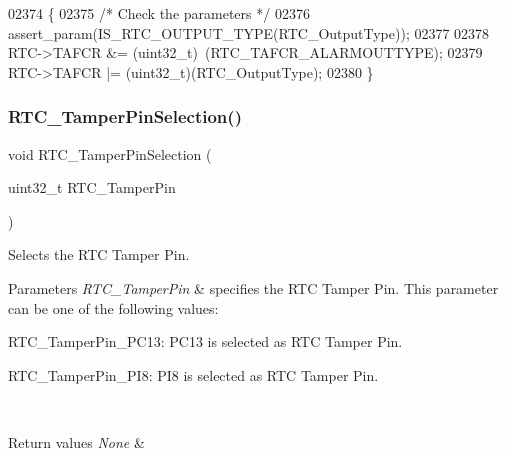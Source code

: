\begin{DoxyCode}
02374 \{
02375   \textcolor{comment}{/* Check the parameters */}
02376   assert_param(IS_RTC_OUTPUT_TYPE(RTC\_OutputType));
02377   
02378   RTC->TAFCR &= (uint32\_t)~(RTC_TAFCR_ALARMOUTTYPE);
02379   RTC->TAFCR |= (uint32\_t)(RTC\_OutputType);  
02380 \}
\end{DoxyCode}
\mbox{\label{group__RTC__Group11_ga46777272ae77eb9dc38610481e12b0ed}} 
\subsubsection{R\+T\+C\+\_\+\+Tamper\+Pin\+Selection()}
{\footnotesize\ttfamily void R\+T\+C\+\_\+\+Tamper\+Pin\+Selection (\begin{DoxyParamCaption}\item[{uint32\+\_\+t}]{R\+T\+C\+\_\+\+Tamper\+Pin }\end{DoxyParamCaption})}



Selects the R\+TC Tamper Pin. 


\begin{DoxyParams}{Parameters}
{\em R\+T\+C\+\_\+\+Tamper\+Pin} & specifies the R\+TC Tamper Pin. This parameter can be one of the following values\+: \begin{DoxyItemize}
\item R\+T\+C\+\_\+\+Tamper\+Pin\+\_\+\+P\+C13\+: P\+C13 is selected as R\+TC Tamper Pin. \item R\+T\+C\+\_\+\+Tamper\+Pin\+\_\+\+P\+I8\+: P\+I8 is selected as R\+TC Tamper Pin. \end{DoxyItemize}
\\
\hline
\end{DoxyParams}

\begin{DoxyRetVals}{Return values}
{\em None} & \\
\hline
\end{DoxyRetVals}


